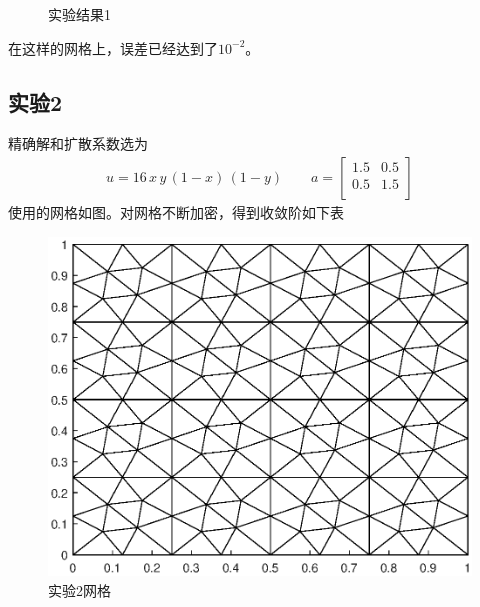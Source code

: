 \documentclass[12pt,a4paper]{article}
\theoremstyle{plain}
\begin{document}
\begin{figure}[H]
\centering
{}
\caption{实验结果1}
\end{figure}

在这样的网格上，误差已经达到了$10^{-2}$。

\subsection*{实验2}

精确解和扩散系数选为
\begin{align*}
u = 16 \, x \, y \, (1-x) \, (1-y) \qquad
a = \left[
\begin{matrix}
1.5 & 0.5 \\
0.5 & 1.5 \\
\end{matrix}
\right]
\end{align*}
使用的网格如图。对网格不断加密，得到收敛阶如下表
\begin{figure}[H]
\centering
\includegraphics[width=0.4\linewidth]{mesh2}
\caption{实验2网格}
\end{figure}
\end{document}
